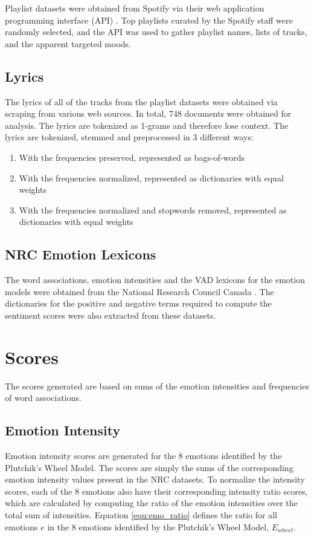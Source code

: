 \documentclass[11pt]{article}
\begin{document}
Playlist datasets were obtained from Spotify via their web application programming interface (API) \cite{spotify}. Top playlists curated by the Spotify staff were randomly selected, and the API was used to gather playlist names, lists of tracks, and the apparent targeted moods.

\subsection{Lyrics}

The lyrics of all of the tracks from the playlist datasets were obtained via scraping from various web sources. In total, 748 documents were obtained for analysis. The lyrics are tokenized as 1-grams and therefore lose context. The lyrics are tokenized, stemmed and preprocessed in 3 different ways:
\begin{enumerate}
  \item With the frequencies preserved, represented as bags-of-words
  \item With the frequencies normalized, represented as dictionaries with equal weights
  \item With the frequencies normalized and stopwords removed, represented as dictionaries with equal weights
\end{enumerate}

\subsection{NRC Emotion Lexicons}

The word associations, emotion intensities and the VAD lexicons for the emotion models were obtained from the National Research Council Canada \cite{LREC18-AIL,Mohammad13,vad-acl2018}. The dictionaries for the positive and negative terms required to compute the sentiment scores were also extracted from these datasets.

\section{Scores}

The scores generated are based on sums of the emotion intensities and frequencies of word associations.

\subsection{Emotion Intensity}

Emotion intensity scores are generated for the 8 emotions identified by the Plutchik's Wheel Model. The scores are simply the sums of the corresponding emotion intensity values present in the NRC datasets. To normalize the intensity scores, each of the 8 emotions also have their corresponding intensity ratio scores, which are calculated by computing the ratio of the emotion intensities over the total sum of intensities. Equation \ref{equ:emo_ratio} defines the ratio for all emotions $e$ in the 8 emotions identified by the Plutchik's Wheel Model, $E_{wheel}$.
\end{document}
